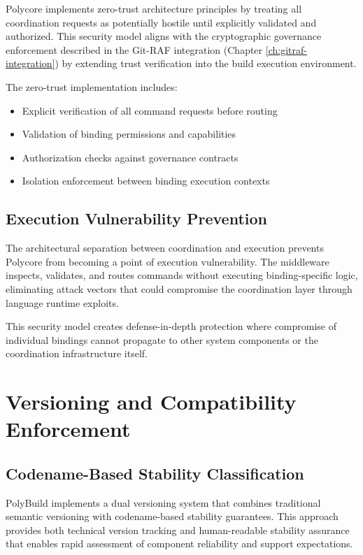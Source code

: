 Polycore implements zero-trust architecture principles by treating all coordination requests as potentially hostile until explicitly validated and authorized. This security model aligns with the cryptographic governance enforcement described in the Git-RAF integration (Chapter \ref{ch:gitraf-integration}) by extending trust verification into the build execution environment.

The zero-trust implementation includes:
\begin{itemize}
\item Explicit verification of all command requests before routing
\item Validation of binding permissions and capabilities
\item Authorization checks against governance contracts
\item Isolation enforcement between binding execution contexts
\end{itemize}

\subsection{Execution Vulnerability Prevention}

The architectural separation between coordination and execution prevents Polycore from becoming a point of execution vulnerability. The middleware inspects, validates, and routes commands without executing binding-specific logic, eliminating attack vectors that could compromise the coordination layer through language runtime exploits.

This security model creates defense-in-depth protection where compromise of individual bindings cannot propagate to other system components or the coordination infrastructure itself.

\section{Versioning and Compatibility Enforcement}

\subsection{Codename-Based Stability Classification}

PolyBuild implements a dual versioning system that combines traditional semantic versioning with codename-based stability guarantees. This approach provides both technical version tracking and human-readable stability assurance that enables rapid assessment of component reliability and support expectations.

